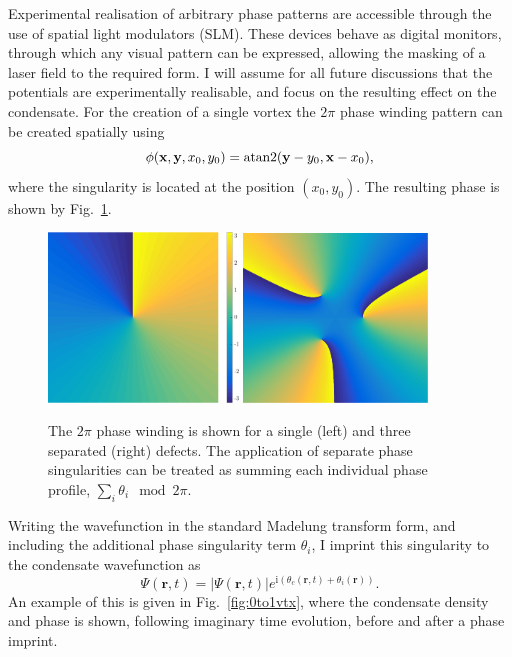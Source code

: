 {Experimental realisation of arbitrary phase patterns are accessible through the use of spatial light modulators (SLM). These devices behave as digital monitors, through which any visual pattern can be expressed, allowing the masking of a laser field to the required form. I will assume for all future discussions that the potentials are experimentally realisable, and focus on the resulting effect on the condensate. For the creation of a single vortex the $2\pi$ phase winding pattern can be created spatially using
\begin{equation}
    \phi(\mathbf{x},\mathbf{y},x_0,y_0) = \operatorname*{atan2}(\mathbf{y}-y_0,\mathbf{x}-x_0),
\end{equation}
where the singularity is located at the position $\left(x_0,y_0\right)$. The resulting phase is shown by Fig.~\ref{fig:atan2phase}.
\begin{figure}\centering
    \includegraphics[width=0.45\textwidth]{Images/ch4_vtx/2pi.pdf}
    \includegraphics[width=0.435\textwidth]{Images/ch4_vtx/3_2pi.pdf}
    \caption{The $2\pi$ phase winding is shown for a single (left) and three separated (right) defects. The application of separate phase singularities can be treated as summing each individual phase profile, $\displaystyle\sum\limits_i \theta_i \mod 2\pi$.}\label{fig:atan2phase}
\end{figure}

Writing the wavefunction in the standard Madelung transform form, and including the additional phase singularity term $\theta_i$, I imprint this singularity to the condensate wavefunction as
\begin{equation}
    \Psi(\mathbf{r},t) = |\Psi(\mathbf{r},t)|e^{\text{i}(\theta_c(\mathbf{r},t) + \theta_i(\mathbf{r}))}.
\end{equation}
An example of this is given in Fig.~\ref{fig:0to1vtx}, where the condensate density and phase is shown, following imaginary time evolution, before and after a phase imprint.

}
